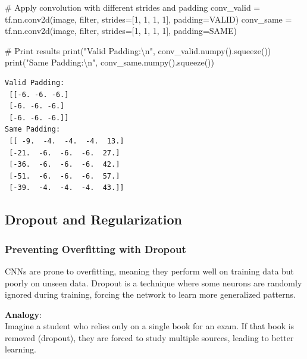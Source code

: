 \documentclass[
  letterpaper,
  DIV=11,
  numbers=noendperiod]{scrreprt}
\newenvironment{Shaded}{\begin{snugshade}}{\end{snugshade}}
\newcommand{\BuiltInTok}[1]{\textcolor[rgb]{0.00,0.23,0.31}{#1}}
\newcommand{\CharTok}[1]{\textcolor[rgb]{0.13,0.47,0.30}{#1}}
\newcommand{\CommentTok}[1]{\textcolor[rgb]{0.37,0.37,0.37}{#1}}
\newcommand{\DecValTok}[1]{\textcolor[rgb]{0.68,0.00,0.00}{#1}}
\newcommand{\NormalTok}[1]{\textcolor[rgb]{0.00,0.23,0.31}{#1}}
\newcommand{\OperatorTok}[1]{\textcolor[rgb]{0.37,0.37,0.37}{#1}}
\newcommand{\StringTok}[1]{\textcolor[rgb]{0.13,0.47,0.30}{#1}}
\begin{document}
\begin{Shaded}
\begin{Highlighting}[]
\CommentTok{\# Apply convolution with different strides and padding}
\NormalTok{conv\_valid }\OperatorTok{=}\NormalTok{ tf.nn.conv2d(image, }\BuiltInTok{filter}\NormalTok{, strides}\OperatorTok{=}\NormalTok{[}\DecValTok{1}\NormalTok{, }\DecValTok{1}\NormalTok{, }\DecValTok{1}\NormalTok{, }\DecValTok{1}\NormalTok{], padding}\OperatorTok{=}\StringTok{\textquotesingle{}VALID\textquotesingle{}}\NormalTok{)}
\NormalTok{conv\_same }\OperatorTok{=}\NormalTok{ tf.nn.conv2d(image, }\BuiltInTok{filter}\NormalTok{, strides}\OperatorTok{=}\NormalTok{[}\DecValTok{1}\NormalTok{, }\DecValTok{1}\NormalTok{, }\DecValTok{1}\NormalTok{, }\DecValTok{1}\NormalTok{], padding}\OperatorTok{=}\StringTok{\textquotesingle{}SAME\textquotesingle{}}\NormalTok{)}

\CommentTok{\# Print results}
\BuiltInTok{print}\NormalTok{(}\StringTok{"Valid Padding:}\CharTok{\textbackslash{}n}\StringTok{"}\NormalTok{, conv\_valid.numpy().squeeze())}
\BuiltInTok{print}\NormalTok{(}\StringTok{"Same Padding:}\CharTok{\textbackslash{}n}\StringTok{"}\NormalTok{, conv\_same.numpy().squeeze())}
\end{Highlighting}
\end{Shaded}

\begin{verbatim}
Valid Padding:
 [[-6. -6. -6.]
 [-6. -6. -6.]
 [-6. -6. -6.]]
Same Padding:
 [[ -9.  -4.  -4.  -4.  13.]
 [-21.  -6.  -6.  -6.  27.]
 [-36.  -6.  -6.  -6.  42.]
 [-51.  -6.  -6.  -6.  57.]
 [-39.  -4.  -4.  -4.  43.]]
\end{verbatim}

\subsection{Dropout and
Regularization}\label{dropout-and-regularization}

\subsubsection{Preventing Overfitting with
Dropout}\label{preventing-overfitting-with-dropout}

CNNs are prone to overfitting, meaning they perform well on training
data but poorly on unseen data. Dropout is a technique where some
neurons are randomly ignored during training, forcing the network to
learn more generalized patterns.

\textbf{Analogy}:\\
Imagine a student who relies only on a single book for an exam. If that
book is removed (dropout), they are forced to study multiple sources,
leading to better learning.
\end{document}
